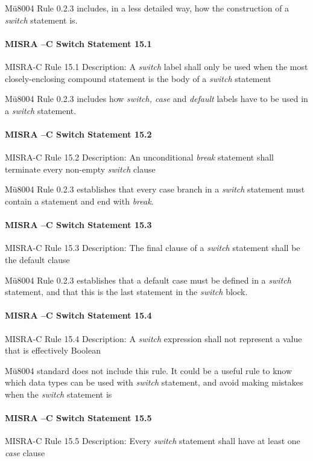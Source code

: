 Mü8004 Rule 0.2.3 includes, in a less detailed way, how the construction of a \textit{switch} statement is. 

\paragraph{MISRA –C Switch Statement 15.1}
MISRA-C Rule 15.1 Description: A \textit{switch} label shall only be used when the most closely-enclosing compound statement is the body of a \textit{switch} statement

Mü8004 Rule 0.2.3 includes how \textit{switch, case} and \textit{default} labels have to be used in a \textit{switch} statement.

\paragraph{MISRA –C Switch Statement 15.2}
MISRA-C Rule 15.2 Description: An unconditional \textit{break} statement shall terminate every non-empty \textit{switch} clause

Mü8004 Rule 0.2.3 establishes that every case branch in a \textit{switch} statement must contain a statement and end with \textit{break}.

\paragraph{MISRA –C Switch Statement 15.3}
MISRA-C Rule 15.3 Description: The final clause of a \textit{switch} statement shall be the default clause

Mü8004 Rule 0.2.3 establishes that a default case must be defined in a \textit{switch} statement, and that this is the last statement in the \textit{switch} block.

\paragraph{MISRA –C Switch Statement 15.4}
MISRA-C Rule 15.4 Description: A \textit{switch} expression shall not represent a value that is effectively Boolean

Mü8004 standard does not include this rule. It could be a useful rule to know which data types can be used with \textit{switch} statement, and avoid making mistakes when the \textit{switch} statement is 

\paragraph{MISRA –C Switch Statement 15.5}
MISRA-C Rule 15.5 Description: Every \textit{switch} statement shall have at least one \textit{case} clause

